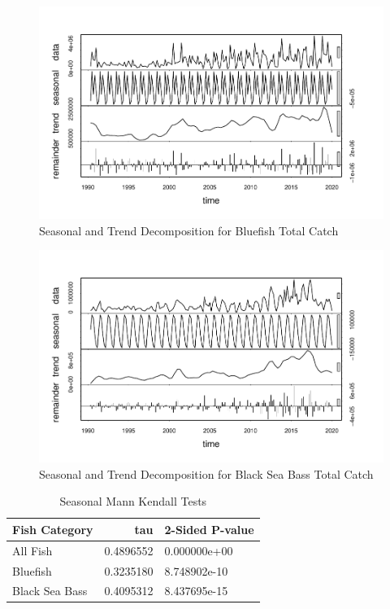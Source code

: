 \documentclass[
  12pt,
]{article}
\begin{document}
\begin{figure}[H]

\hfill{}\includegraphics{Report_FishTrends_files/figure-latex/Bluefish Trends-1} 

\caption{Seasonal and Trend Decomposition for Bluefish Total Catch}\label{fig:Bluefish Trends}
\end{figure}

\begin{figure}[H]

\hfill{}\includegraphics{Report_FishTrends_files/figure-latex/Black Sea Bass Trends-1} 

\caption{Seasonal and Trend Decomposition for Black Sea Bass Total Catch}\label{fig:Black Sea Bass Trends}
\end{figure}

\begin{table}[H]

\caption{\label{tab:table4}Seasonal Mann Kendall Tests}
\centering
\begin{tabular}[t]{l|r|l}
\hline
Fish Category & tau & 2-Sided P-value\\
\hline
All Fish & 0.4896552 & 0.000000e+00\\
\hline
Bluefish & 0.3235180 & 8.748902e-10\\
\hline
Black Sea Bass & 0.4095312 & 8.437695e-15\\
\hline
\end{tabular}
\end{table}
\end{document}
